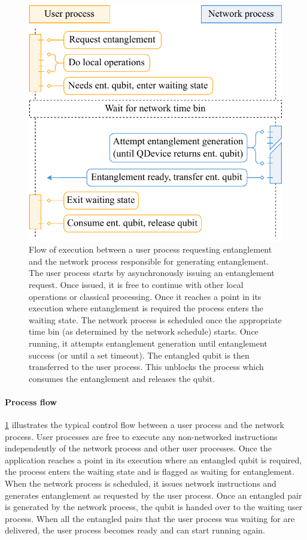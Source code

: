 \begin{figure}
    \centering
    \includegraphics[width=0.6\linewidth]{figures/process-flow.pdf}
    \caption{Flow of execution between a user process requesting entanglement and the network process
        responsible for generating entanglement. The user process starts by asynchronously issuing an
        entanglement request. Once issued, it is free to continue with other local operations or
        classical processing. Once it reaches a point in its execution where entanglement is required
        the process enters the waiting state. The network process is scheduled once the appropriate time
        bin (as determined by the network schedule) starts. Once running, it attempts entanglement
        generation until entanglement success (or until a set timeout). The entangled qubit is then
        transferred to the user process. This unblocks the process which consumes the entanglement and
        releases the qubit.}
    \label{fig:process-flow}
\end{figure}

\paragraph{Process flow}

\cref{fig:process-flow} illustrates the typical control flow between a user process and the network
process. User processes are free to execute any non-networked instructions independently of the
network process and other user processes. Once the application reaches a point in its execution
where an entangled qubit is required, the process enters the waiting state and is flagged as waiting
for entanglement. When the network process is scheduled, it issues network instructions and
generates entanglement as requested by the user process. Once an entangled pair is generated by the
network process, the qubit is handed over to the waiting user process. When all the entangled pairs
that the user process was waiting for are delivered, the user process becomes ready and can start
running again.


